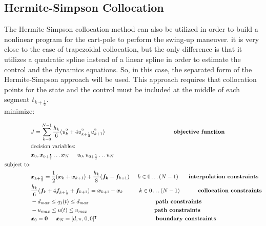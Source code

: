 \documentclass{thesisreport}
\begin{document}
\subsection{Hermite-Simpson Collocation}

The Hermite-Simpson collocation method can also be utilized in order to build a nonlinear program for the cart-pole to perform the swing-up maneuver. it is very close to the case of trapezoidal collocation, but the only difference is that it utilizes a quadratic spline instead of a linear spline in order to estimate the control and the dynamics equations. So, in this case, the separated form of the Hermite-Simpson approach will be used. This approach requires that collocation points for the state and the control must be included at the middle of each segment $t_{k+\frac{1}{2}}$.\\

minimize:

\begin{align}
&J = \sum_{k=0}^{N-1} \frac{h_k}{6}(u_k^2 + 4 u_{k+\frac{1}{2}}^2 u^2_{k+1}) \textbf{ \hspace{4cm} objective function} \\
&\text{decision variables:} \nonumber \\
&\bm{x}_0, \bm{x}_{0+\frac{1}{2}} \ldots\bm{x}_N \text{\hspace{0.5cm}} u_0,u_{0+\frac{1}{2}} \ldots u_N \\
\text{subject to:} \nonumber \\
&\bm{x}_{k+\frac{1}{2}} = \frac{1}{2}(\bm{x}_k + \bm{x}_{k+1}) + \frac{h_k}{8}(\bm{f_k}-\bm{f}_{k+1}) \text{\hspace{0.5cm}} k\in 0 \ldots (N-1) \textbf{\hspace{0.5cm} interpolation constraints}\\
&\frac{h_k}{6}(\bm{f}_k + 4 \bm{f}_{k+\frac{1}{2}} + \bm{f}_{k+1}) = \bm{x}_{k+1} - \bm{x}_k  \text{\hspace{1cm}} k\in 0 \ldots (N-1) \textbf{\hspace{1cm} collocation constraints}\\
&-d_{max} \leq q_1(t) \leq d_{max} \textbf{\hspace{4cm} path constraints} \\
&-u_{max} \leq u(t) \leq u_{max} \textbf{\hspace{4cm} path constraints} \\
&\bm{x}_0 = \bm{0} \text{\hspace{0.5cm}} \bm{x}_N=[d,\pi,0,0]^{\intercal} \textbf{\hspace{3.5cm} boundary constraints}
\end{align}
\end{document}
